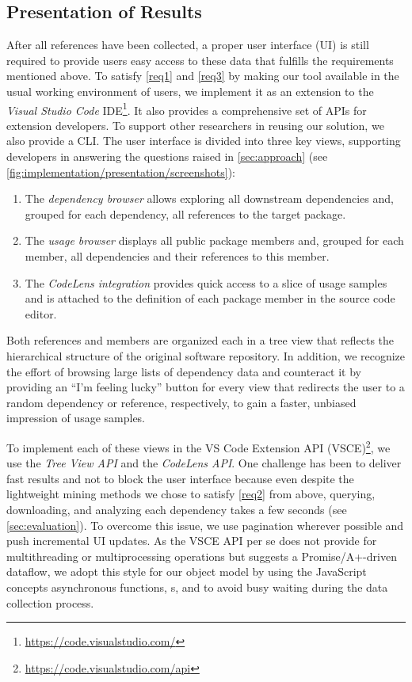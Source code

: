 \documentclass[a4paper,twoside]{article}
\begin{document}
\subsection{Presentation of Results}
\label{sec:implementation/presentation}

After all references have been collected, a proper user interface (UI) is still required to provide users easy access to these data that fulfills the requirements mentioned above.
To satisfy \cref{req1} and \cref{req3} by making our tool available in the usual working environment of users, we implement it as an extension to the \emph{Visual Studio Code} IDE\footnote{\url{https://code.visualstudio.com/}}.
It also provides a comprehensive set of APIs for extension developers.
To support other researchers in reusing our solution, we also provide a CLI.
The user interface is divided into three key views, supporting developers in answering the questions raised in \cref{sec:approach} (see \cref{fig:implementation/presentation/screenshots}):

\begin{enumerate}[label=(\roman*)]
	\item The \emph{dependency browser} allows exploring all downstream dependencies and, grouped for each dependency, all references to the target package.
	\item The \emph{usage browser} displays all public package members and, grouped for each member, all dependencies and their references to this member.
	\item The \emph{CodeLens integration} provides quick access to a slice of usage samples and is attached to the definition of each package member in the source code editor.
\end{enumerate}

Both references and members are organized each in a tree view that reflects the hierarchical structure of the original software repository.
In addition, we recognize the effort of browsing large lists of dependency data and counteract it by providing an \enquote{I'm feeling lucky} button for every view that redirects the user to a random dependency or reference, respectively, to gain a faster, unbiased impression of usage samples.

To implement each of these views in the VS Code Extension API (VSCE)\footnote{\url{https://code.visualstudio.com/api}}, we use the \emph{Tree View API} and the \emph{CodeLens API}.
One challenge has been to deliver fast results and not to block the user interface because even despite the lightweight mining methods we chose to satisfy \cref{req2} from above, querying, downloading, and analyzing each dependency takes a few seconds (see \cref{sec:evaluation}).
To overcome this issue, we use pagination wherever possible and push incremental UI updates. %
As the VSCE API per se does not provide for multithreading or multiprocessing operations but suggests a Promise/A+-driven dataflow, we adopt this style for our object model by using the JavaScript concepts asynchronous functions, s, and  to avoid busy waiting during the data collection process.
\end{document}
